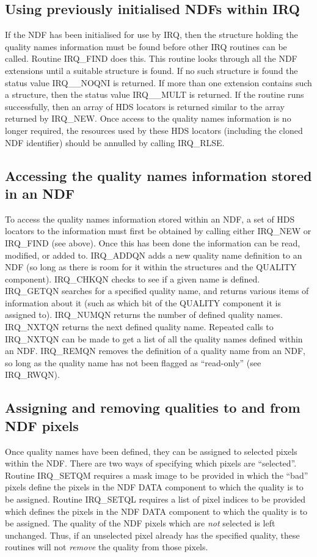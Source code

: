 \subsection{Using previously initialised NDFs within IRQ}
If the NDF has been initialised for use by IRQ, then the structure holding the
quality names information must be found before other IRQ routines can be called.
Routine IRQ\_FIND does this. This routine looks through all the NDF extensions
until a suitable structure is found. If no such structure is found the status
value IRQ\_\_NOQNI is returned. If more than one extension contains such a
structure, then the status value IRQ\_\_MULT is returned. If the routine runs
successfully, then an array of HDS locators is returned similar to the array
returned by IRQ\_NEW. Once access to the quality names information is no longer
required, the resources used by these HDS locators (including the cloned
NDF identifier) should be annulled by calling IRQ\_RLSE.

\subsection{Accessing the quality names information stored in an NDF}
To access the quality names information stored within an NDF, a set of HDS
locators to the information must first be obtained by calling either IRQ\_NEW or
IRQ\_FIND (see above). Once this has been done the information can be read,
modified, or added to. IRQ\_ADDQN adds a new quality name definition to an NDF
(so long as there is room for it within the structures and the QUALITY
component). IRQ\_CHKQN checks to see if a given name is defined. IRQ\_GETQN
searches for a specified quality name, and
returns various items of information about it (such as which bit of the QUALITY
component it is assigned to). IRQ\_NUMQN returns the number of defined quality
names. IRQ\_NXTQN returns the next defined quality name. Repeated calls to
IRQ\_NXTQN can be made to get a list of all the quality names defined within an
NDF. IRQ\_REMQN removes the definition of a quality name from an NDF, so
long as the quality name has not been flagged as ``read-only'' (see
IRQ\_RWQN).

\subsection{Assigning and removing qualities to and from NDF pixels}
Once quality names have been defined, they can be assigned to selected pixels
within the NDF. There are two ways of specifying which pixels are ``selected''.
Routine IRQ\_SETQM requires a mask image to be provided in which the ``bad''
pixels define the pixels in the NDF DATA component to which the quality is to be
assigned. Routine IRQ\_SETQL requires a list of pixel indices to be provided
which defines the pixels in the NDF DATA component to which the quality is to be
assigned. The quality of the NDF pixels which are {\em not} selected is left
unchanged. Thus, if an unselected pixel already has the specified quality, these
routines will not {\em remove} the quality from those pixels.

